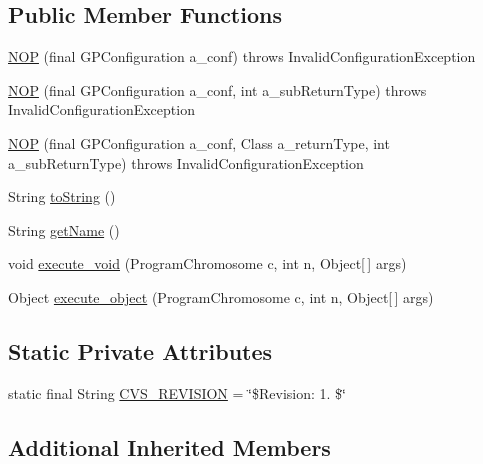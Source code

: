 \subsection*{Public Member Functions}
\begin{DoxyCompactItemize}
\item 
\hyperlink{classorg_1_1jgap_1_1gp_1_1terminal_1_1_n_o_p_ad72a5167fd511df91c263d18e9f3612d}{N\-O\-P} (final G\-P\-Configuration a\-\_\-conf)  throws Invalid\-Configuration\-Exception 
\item 
\hyperlink{classorg_1_1jgap_1_1gp_1_1terminal_1_1_n_o_p_a9a2cbc7d8554aa68b5bf75768913f14c}{N\-O\-P} (final G\-P\-Configuration a\-\_\-conf, int a\-\_\-sub\-Return\-Type)  throws Invalid\-Configuration\-Exception 
\item 
\hyperlink{classorg_1_1jgap_1_1gp_1_1terminal_1_1_n_o_p_a8ace5d269be78f2143339d549b8a9946}{N\-O\-P} (final G\-P\-Configuration a\-\_\-conf, Class a\-\_\-return\-Type, int a\-\_\-sub\-Return\-Type)  throws Invalid\-Configuration\-Exception 
\item 
String \hyperlink{classorg_1_1jgap_1_1gp_1_1terminal_1_1_n_o_p_a2136240d53b3d861b1bba7bebb21d975}{to\-String} ()
\item 
String \hyperlink{classorg_1_1jgap_1_1gp_1_1terminal_1_1_n_o_p_af52e9c56ccc2e022e61bbbdda0efe027}{get\-Name} ()
\item 
void \hyperlink{classorg_1_1jgap_1_1gp_1_1terminal_1_1_n_o_p_aa2b2c9ad99e135318fa1f938fb093b3b}{execute\-\_\-void} (Program\-Chromosome c, int n, Object\mbox{[}$\,$\mbox{]} args)
\item 
Object \hyperlink{classorg_1_1jgap_1_1gp_1_1terminal_1_1_n_o_p_a59d90eee81bd26336621a73f445a783d}{execute\-\_\-object} (Program\-Chromosome c, int n, Object\mbox{[}$\,$\mbox{]} args)
\end{DoxyCompactItemize}
\subsection*{Static Private Attributes}
\begin{DoxyCompactItemize}
\item 
static final String \hyperlink{classorg_1_1jgap_1_1gp_1_1terminal_1_1_n_o_p_aa4fae3892097653ceb59bcc2d9fcf1e3}{C\-V\-S\-\_\-\-R\-E\-V\-I\-S\-I\-O\-N} = \char`\"{}\$Revision\-: 1. \$\char`\"{}
\end{DoxyCompactItemize}
\subsection*{Additional Inherited Members}


